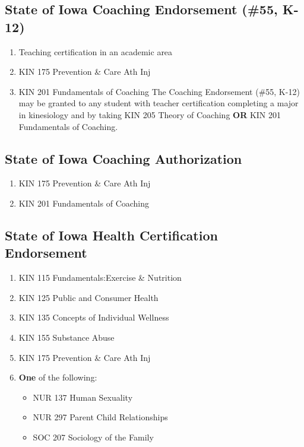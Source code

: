 \documentclass[
  letterpaper,
]{scrbook}
\providecommand{\tightlist}{%
  \setlength{\itemsep}{0pt}\setlength{\parskip}{0pt}}
\begin{document}
\subsection{State of Iowa Coaching Endorsement (\#55,
K-12)}\label{state-of-iowa-coaching-endorsement-55-k-12}

\begin{enumerate}
\def\labelenumi{\arabic{enumi}.}
\tightlist
\item
  Teaching certification in an academic area
\item
  KIN 175 Prevention \& Care Ath Inj
\item
  KIN 201 Fundamentals of Coaching The Coaching Endorsement (\#55, K-12)
  may be granted to any student with teacher certification completing a
  major in kinesiology and by taking KIN 205 Theory of Coaching
  \textbf{OR} KIN 201 Fundamentals of Coaching.
\end{enumerate}

\subsection{State of Iowa Coaching
Authorization}\label{state-of-iowa-coaching-authorization}

\begin{enumerate}
\def\labelenumi{\arabic{enumi}.}
\tightlist
\item
  KIN 175 Prevention \& Care Ath Inj
\item
  KIN 201 Fundamentals of Coaching
\end{enumerate}

\subsection{State of Iowa Health Certification
Endorsement}\label{state-of-iowa-health-certification-endorsement}

\begin{enumerate}
\def\labelenumi{\arabic{enumi}.}
\tightlist
\item
  KIN 115 Fundamentals:Exercise \& Nutrition
\item
  KIN 125 Public and Consumer Health
\item
  KIN 135 Concepts of Individual Wellness
\item
  KIN 155 Substance Abuse
\item
  KIN 175 Prevention \& Care Ath Inj
\item
  \textbf{One} of the following:

  \begin{itemize}
  \tightlist
  \item
    NUR 137 Human Sexuality
  \item
    NUR 297 Parent Child Relationships
  \item
    SOC 207 Sociology of the Family
  \end{itemize}
\end{enumerate}
\end{document}
